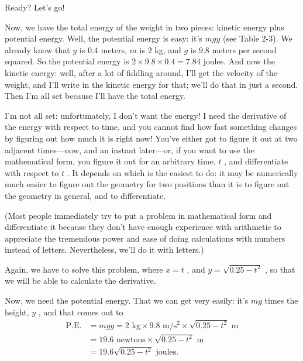 \documentclass[11pt,oneside]{article}
\begin{document}
Ready? Let's go!\par

Now, we have the total energy of the weight in two pieces: kinetic energy plus potential energy. Well, the potential energy is easy: it's \(mgy\) (see Table 2-3). We already know that \(y\) is \(0.4\) meters, \(m\) is \(2\) kg, and \(g\) is \(9.8\) meters per second squared. So the potential energy is \(2 \times 9.8 \times 0.4 = 7.84\) joules. And now the kinetic energy: well, after a lot of fiddling around, I'll get the velocity of the weight, and I'll write in the kinetic energy for that; we'll do that in just a second. Then I'm all set because I'll have the total energy.\par

I'm not all set: unfortunately, I don't want the energy! I need the derivative of the energy with respect to time, and you cannot find how fast something changes by figuring out how much it is right now! You've either got to figure it out at two adjacent times---now, and an instant later---or, if you want to use the mathematical form, you figure it out for an arbitrary time, \(t\) , and differentiate with respect to \(t\) . It depends on which is the easiest to do: it may be numerically much easier to figure out the geometry for two positions than it is to figure out the geometry in general, and to differentiate.\par

(Most people immediately try to put a problem in mathematical form and differentiate it because they don't have enough experience with arithmetic to appreciate the tremendous power and ease of doing calculations with numbers instead of letters. Nevertheless, we'll do it with letters.)\par

Again, we have to solve this problem, where \(x=t\) , and \(y=\sqrt{0.25-t^2}\) , so that we will be able to calculate the derivative.\par

Now, we need the potential energy. That we can get very easily: it's \(mg\) times the height, \(y\) , and that comes out to 
\begin{equation*} \begin{aligned} \mathrm{P.E.} &= mgy = 2\text{ kg} \times 9.8 \text{ m}/\text{s}^2 \times \sqrt{0.25-t^2} \text{ m}\\[1ex] &= 19.6 \text{ newtons} \times \sqrt{0.25-t^2} \text{ m}\\[1ex] &= 19.6\sqrt{0.25-t^2} \text{ joules}. \end{aligned} \tag{2.25}
\label{Eq:TIPS:2:25} \end{equation*}
\par
\end{document}
